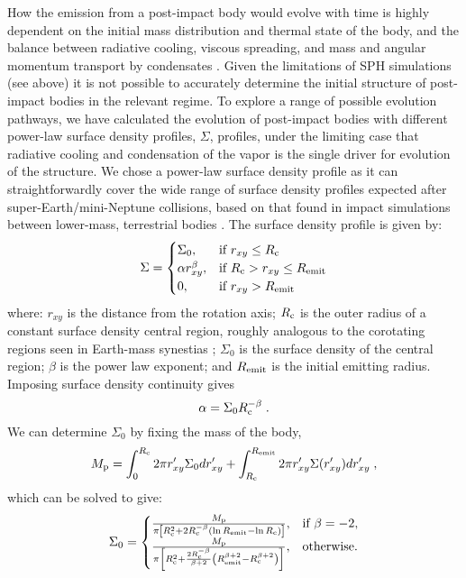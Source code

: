 \documentclass[sn-nature]{sn-jnl}%
\begin{document}
How the emission from a post-impact body would evolve with time is highly dependent on the initial mass distribution and thermal state of the body, and the balance between radiative cooling, viscous spreading, and mass and angular momentum transport by condensates \cite{Lock2017,Lock2018moon,Lock2020}. 
%
Given the limitations of SPH simulations (see above) it is not possible to accurately determine the initial structure of post-impact bodies in the relevant regime.
%
To explore a range of possible evolution pathways, we have calculated the evolution of post-impact bodies with different power-law surface density profiles, $\Sigma$, profiles, under the limiting case that radiative cooling and condensation of the vapor is the single driver for evolution of the structure. 
%
We chose a power-law surface density profile as it can straightforwardly cover the wide range of surface density profiles expected after super-Earth/mini-Neptune collisions, based on that found in impact simulations between lower-mass, terrestrial bodies \cite{Lock2017,Canup2001,Canup2012,Cuk2012,Rufu2017,Reufer2012}. 
%
The surface density profile is given by:
%
\begin{equation}
\Sigma=\begin{cases}
\Sigma_0, & \text{if } r_{xy}\leq R_{\rm c}\\
\alpha r_{xy}^{\beta}, & \text{if } R_{\rm c} > r_{xy}\leq R_{\rm emit}\\
0, & \text{if } r_{xy}> R_{\rm emit}
\end{cases}   
\label{eqn:sigma}
\end{equation}
%
where: $r_{xy}$ is the distance from the rotation axis; $R_{\rm c}$ is the outer radius of a constant surface density central region, roughly analogous to the corotating regions seen in Earth-mass synestias \cite{Lock2017,Lock2018moon}; $\Sigma_0$ is the surface density of the central region; $\beta$ is the power law exponent; and $R_{\rm emit}$ is the initial emitting radius. Imposing surface density continuity gives
%
\begin{equation}
    \alpha=\Sigma_0 R_{\rm c}^{-\beta} \; .
\end{equation}
%
We can determine $\Sigma_0$ by fixing the mass of the body, 
%
\begin{equation}
    M_{\rm p} = \int_0^{R_{\rm c}}{2 \pi r'_{xy} \Sigma_0 dr'_{xy}} + \int_{R_{\rm c}}^{R_{\rm emit}}{2 \pi r'_{xy} \Sigma(r'_{xy}) dr'_{xy}} \; ,
\end{equation}
%
which can be solved to give:
%
\begin{equation}
\Sigma_0=\begin{cases}
\frac{M_{\rm p}}{\pi \left [R_{\rm c}^2 + 2 R_{\rm c}^{-\beta} \left ( \ln{R_{\rm emit}}-\ln{R_{\rm c}}\right ) \right ]}, & \text{if } \beta=-2,\\
\frac{M_{\rm p}}{\pi \left [R_{\rm c}^2 + \frac{2 R_{\rm c}^{-\beta}}{\beta+2} \left ( R_{\rm emit}^{\beta+2}-R_{\rm c}^{\beta+2}\right ) \right ]}, & \text{otherwise.} 
\end{cases}
\end{equation}
\end{document}
